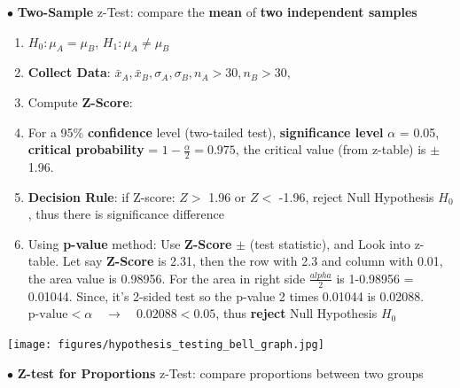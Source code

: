 \documentclass[letterpaper, 10.5pt,landscape]{article}
\begin{document}
\begin{multicols*}{3}
$\bullet$ \textbf{Two-Sample} z-Test: compare the \textbf{mean} of \textbf{two independent samples}
\vspace{-2pt}
\begin{enumerate}
    \item \(H_{0}: \mu_{A} = \mu_{B}\), \quad \(H_{1}: \mu_{A} \neq \mu_{B}\)
    \vspace{-2pt}
    \item \textbf{Collect Data}: \(\bar{x}_{A}, \bar{x}_{B}, \sigma_{A}, \sigma_{B}, n_{A} > 30, n_{B} > 30, \)
    \vspace{-2pt}
    \item Compute \textbf{Z-Score}: 
    \vspace{-2pt}
    \item For a 95\% \textbf{confidence} level (two-tailed test), \textbf{significance level} $\alpha$ = 0.05, \textbf{critical probability} = \(1- \frac{\alpha}{2} = 0.975\), the critical value (from z-table) is $\pm$1.96. 
    \vspace{-2pt}
    \item \textbf{Decision Rule}: if Z-score:  $Z >$ 1.96 or $Z <$ -1.96, reject Null Hypothesis $H_{0}$, thus there is significance difference
    \vspace{-2pt}

    \item Using \textbf{p-value} method: Use \textbf{Z-Score} $\pm$ (test statistic), and Look into z-table. Let say \textbf{Z-Score} is 2.31, then the row with 2.3 and column with 0.01, the area value is 0.98956.
    For the area in right side $\frac{alpha}{2}$ is 1-0.98956 = 0.01044. Since, it's 2-sided test so the p-value 2 times 0.01044 is 0.02088. \(\text{p-value} < \alpha \quad \rightarrow \quad 0.02088 < 0.05\), thus \textbf{reject} Null Hypothesis $H_{0}$
\end{enumerate}
\vspace{-4pt}
\begin{center}
    \begin{minipage}{0.5\linewidth}
    \texttt{[image: figures/hypothesis\_testing\_bell\_graph.jpg]}
    \end{minipage}
\end{center}
\vspace{-4pt}




$\bullet$ \textbf{Z-test for Proportions} z-Test: compare proportions between two groups





\end{multicols*}
\end{document}

